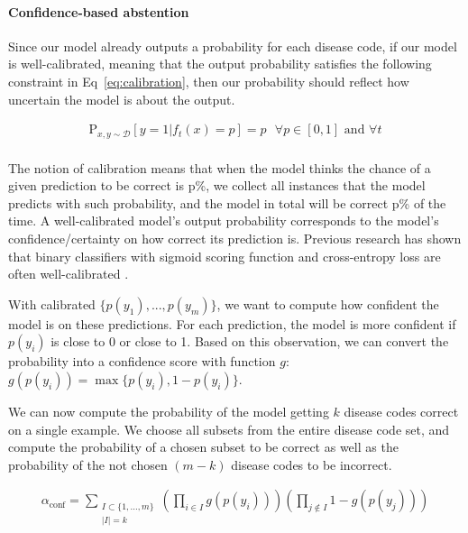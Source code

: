 \documentclass{article}[11pt,oneside]
\begin{document}
\paragraph{Confidence-based abstention}

Since our model already outputs a probability for each disease code, if our model is well-calibrated, meaning that the output probability satisfies the following constraint in Eq~\ref{eq:calibration}, then our probability should reflect how uncertain the model is about the output.

\begin{equation}
\begin{aligned}
\text{P}_{x, y \sim \mathcal{D}}[y=1 | f_t(x) = p] = p \text{ } \forall p \in [0, 1] \text{ and } \forall t \\
\end{aligned}
\label{eq:calibration}
\end{equation}

The notion of calibration means that when the model thinks the chance of a given prediction to be correct is p\%, we collect all instances that the model predicts with such probability, and the model in total will be correct p\% of the time. A well-calibrated model's output probability corresponds to the model's confidence/certainty on how correct its prediction is. Previous research has shown that binary classifiers with sigmoid scoring function and cross-entropy loss are often well-calibrated \cite{niculescu2005predicting}.

With calibrated $\{p(y_1), ..., p(y_m)\}$, we want to compute how confident the model is on these predictions. For each prediction, the model is more confident if $p(y_i)$ is close to 0 or close to 1. Based on this observation, we can convert the probability into a confidence score with function $g$: $g(p(y_i)) = \max\{p(y_i), 1-p(y_i)\}$.

We can now compute the probability of the model getting $k$ disease codes correct on a single example. We choose all subsets from the entire disease code set, and compute the probability of a chosen subset to be correct as well as the probability of the not chosen $(m-k)$ disease codes to be incorrect.

\begin{equation}
\begin{aligned}
\alpha_{\text{conf}} = \sum_{\substack{ I \subset \{1, ..., m\} \\ |I| = k}} (\prod_{i \in I} g(p(y_i))) (\prod_{j \not\in I} 1 - g(p(y_j))) \\
\end{aligned}
\label{eq:abs-baseline}
\end{equation}
\end{document}
